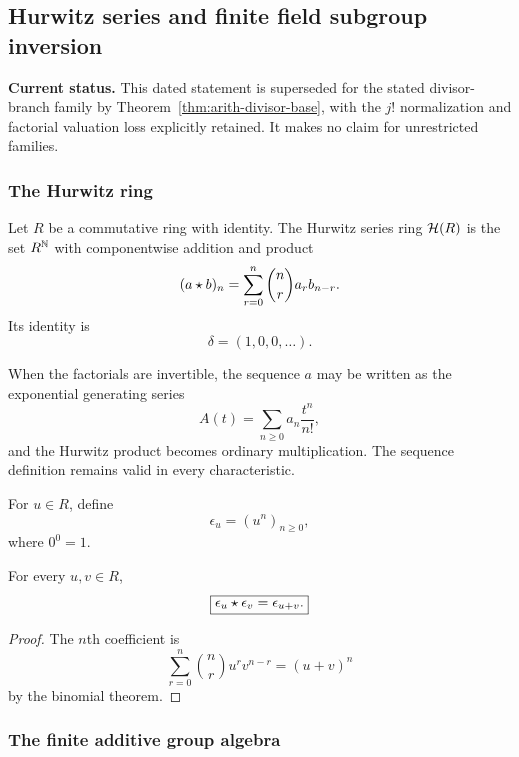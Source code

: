 \subsection{Hurwitz series and finite field subgroup inversion}\label{hist:sec:hurwitz}
\par\smallskip\noindent\textbf{Current status.} This dated statement is superseded for the stated divisor-branch family by Theorem~\ref{thm:arith-divisor-base}, with the $j!$ normalization and factorial valuation loss explicitly retained. It makes no claim for unrestricted families.\par

\subsubsection{The Hurwitz ring}

\begin{histdefinition}\label{hist:def:hurwitz_ring}
Let \(R\) be a commutative ring with identity. The Hurwitz series ring \(\mathcal H(R)\) is the set \(R^{\mathbb N}\) with componentwise addition and product
\[
(a\mathbin{\star} b)_n
=
\sum_{r=0}^{n}
\binom nr a_r b_{n-r}.
\]
Its identity is
\[
\delta=(1,0,0,\ldots).
\]
\end{histdefinition}

When the factorials are invertible, the sequence \(a\) may be written as the exponential generating series
\[
A(t)=\sum_{n\geq0}a_n\frac{t^n}{n!},
\]
and the Hurwitz product becomes ordinary multiplication. The sequence definition remains valid in every characteristic.

\begin{histdefinition}\label{hist:def:exponential_mode}
For \(u\in R\), define
\[
\epsilon_u=(u^n)_{n\geq0},
\]
where \(0^0=1\).
\end{histdefinition}

\begin{histproposition}\label{hist:prop:mode_addition}
For every \(u,v\in R\),
\[
\boxed{
\epsilon_u\mathbin{\star}\epsilon_v
=
\epsilon_{u+v}.
}
\]
\end{histproposition}

\begin{proof}
The \(n\)th coefficient is
\[
\sum_{r=0}^{n}
\binom nr u^rv^{n-r}
=
(u+v)^n
\]
by the binomial theorem.
\end{proof}

\subsubsection{The finite additive group algebra}

